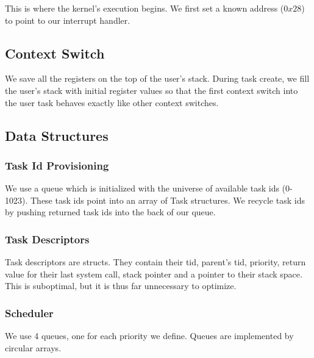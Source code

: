 \documentclass[letterpaper]{article}
\begin{document}
This is where the kernel's execution begins. We first set a known address ($0x28$) to point to our interrupt handler.

\subsection{Context Switch}

We save all the registers on the top of the user's stack. During task create, we fill the user's stack with initial
register values so that the first context switch into the user task behaves exactly like other context switches.

\subsection{Data Structures}

\subsubsection{Task Id Provisioning}
We use a queue which is initialized with the universe of available task ids (0-1023). These task ids point into an array
of Task structures. We recycle task ids by pushing returned task ids into the back of our queue.

\subsubsection{Task Descriptors}
Task descriptors are structs. They contain their tid, parent's tid, priority, return value for their last system call, stack pointer and a pointer to their stack space. This is suboptimal, but it is thus far unnecessary to optimize.

\subsubsection{Scheduler}
We use 4 queues, one for each priority we define. Queues are implemented by circular arrays.
\end{document}
